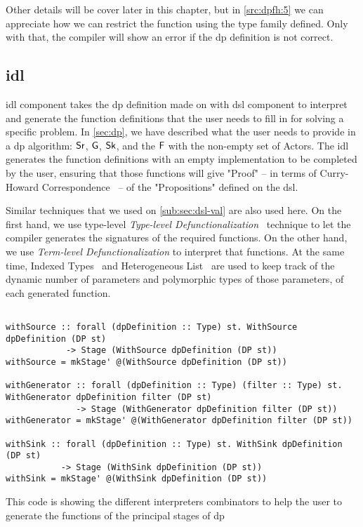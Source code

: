 Other details will be cover later in this chapter, but in \autoref{src:dpfh:5} we can appreciate how we can restrict the function using
the type family defined. Only with that, the compiler will show an error if the \acrshort{dp} definition is not correct.

\subsection{\acrfull{idl}}
\acrshort{idl} component takes the \acrshort{dp} definition made on with \acrshort{dsl} component to interpret and generate the function definitions
that the user needs to fill in for solving a specific problem. In \autoref{sec:dp}, we have described what the user needs to provide in a \acrshort{dp} algorithm: $\mathsf{Sr}$, $\mathsf{G}$, $\mathsf{Sk}$, and the $\mathsf{F}$ with the non-empty set of Actors.
The \acrshort{idl} generates the function definitions with an empty implementation to be completed by the user, ensuring that those functions will give "Proof" -- in terms of Curry-Howard Correspondence~\cite{curryhoward} --  of the "Propositions" defined on the \acrshort{dsl}.

Similar techniques that we used on \autoref{sub:sec:dsl-val} are also used here. On the first hand, we use type-level \emph{Type-level Defunctionalization}~\cite{defunctionalization, fun-type-function-haskell} technique to 
let the compiler generates the signatures of the required functions. On the other hand, we use \emph{Term-level Defunctionalization} to interpret that functions.
At the same time, Indexed Types~\cite{type-index} and Heterogeneous List~\cite{hlist} are used to keep track of the dynamic number of parameters and polymorphic types of those parameters, of each generated function. 

\begin{listing}[htp!]
  \begin{verbatim}

withSource :: forall (dpDefinition :: Type) st. WithSource dpDefinition (DP st) 
            -> Stage (WithSource dpDefinition (DP st))
withSource = mkStage' @(WithSource dpDefinition (DP st))

withGenerator :: forall (dpDefinition :: Type) (filter :: Type) st. WithGenerator dpDefinition filter (DP st) 
              -> Stage (WithGenerator dpDefinition filter (DP st))
withGenerator = mkStage' @(WithGenerator dpDefinition filter (DP st))

withSink :: forall (dpDefinition :: Type) st. WithSink dpDefinition (DP st) 
           -> Stage (WithSink dpDefinition (DP st))
withSink = mkStage' @(WithSink dpDefinition (DP st))
  \end{verbatim}
  \caption[{[\texttt{Stage.hs}] Using with Interpreters of \acrshort{dp} encoded in $G_{dsl}$}]{This code is showing the different interpreters combinators to help the user to generate the functions of the principal stages of \acrshort{dp}}
  \label{src:dpfh:6}
\end{listing}

